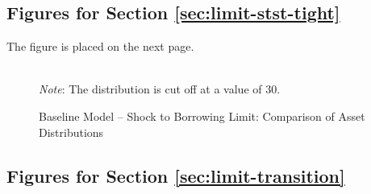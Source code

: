 \documentclass[a4paper,12pt]{article} %
\numberwithin{equation}{section} %
\numberwithin{figure}{section}
\numberwithin{table}{section}
\begin{document}
\begin{refsection}
\begin{appendices}
\subsection{Figures for Section \ref{sec:limit-stst-tight}}
\label{sec-app:figures-limit-tight}

The figure is placed on the next page.

\begin{sidewaysfigure}
    \caption{Baseline Model -- Shock to Borrowing Limit: Comparison of Asset Distributions}
    \label{fig:comparison-stst-baseline-dist}
    \centering

    \\
     \centering
	\textit{Note}: The distribution is cut off at a value of $30$.
\end{sidewaysfigure}

\subsection{Figures for Section \ref{sec:limit-transition}}
\label{sec-app:figures-limit-transition}


\end{appendices}
\end{refsection}
\end{document}
